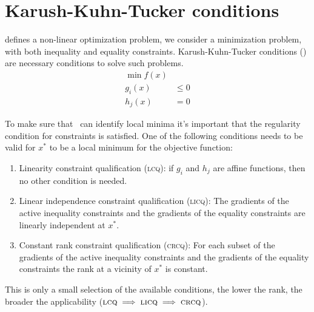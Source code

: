 \chapter{Karush-Kuhn-Tucker conditions}
\label{app:kkt}
 defines a non-linear optimization problem, we consider a minimization
problem, with both inequality and equality constraints. Karush-Kuhn-Tucker conditions (\kkt) are
necessary conditions to solve such problems.
\begin{equation}
	\label{eq:opt-problem}
	\begin{aligned}
		\min{f(x)} &        \\
		g_i(x)     & \leq 0 \\
		h_j(x)     & = 0
	\end{aligned}
\end{equation}

To make sure that \kkt\ can identify local minima it's important that the regularity condition for
constraints is satisfied. One of the following conditions needs to be valid for $x^*$ to be a local
minimum for the objective function:
\begin{enumerate}
	\item Linearity constraint qualification (\textsc{lcq}): if $g_i$ and $h_j$ are affine functions, then no
	      other condition is needed.
	\item Linear independence constraint qualification (\textsc{licq}): The gradients of the active inequality
	      constraints and the gradients of the equality constraints are linearly independent at $x^*$.
	\item Constant rank constraint qualification (\textsc{crcq}): For each subset of the gradients of the active
	      inequality constraints and the gradients of the equality constraints the rank at a vicinity
	      of $x^*$ is constant.
\end{enumerate}
This is only a small selection of the available conditions, the lower the rank, the broader the
applicability ($\textsc{lcq} \implies \textsc{licq} \implies \textsc{crcq}$).

